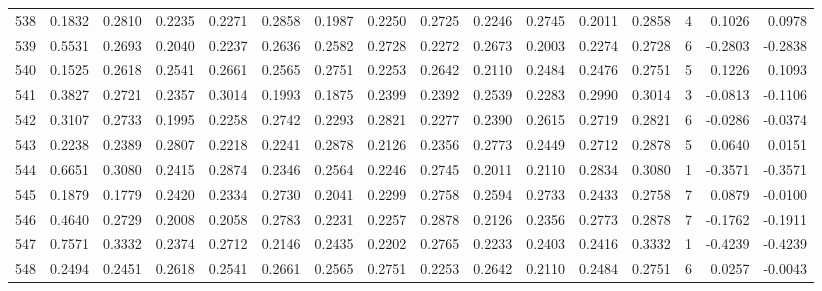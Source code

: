 \begin{tabular}{lrrrrrrrrrrrrrrr}
538 &      0.1832 &  0.2810 &  0.2235 &  0.2271 &  0.2858 &  0.1987 &  0.2250 &  0.2725 &  0.2246 &  0.2745 &   0.2011 &     0.2858 &      4 &                    0.1026 &                     0.0978 \\
539 &      0.5531 &  0.2693 &  0.2040 &  0.2237 &  0.2636 &  0.2582 &  0.2728 &  0.2272 &  0.2673 &  0.2003 &   0.2274 &     0.2728 &      6 &                   -0.2803 &                    -0.2838 \\
540 &      0.1525 &  0.2618 &  0.2541 &  0.2661 &  0.2565 &  0.2751 &  0.2253 &  0.2642 &  0.2110 &  0.2484 &   0.2476 &     0.2751 &      5 &                    0.1226 &                     0.1093 \\
541 &      0.3827 &  0.2721 &  0.2357 &  0.3014 &  0.1993 &  0.1875 &  0.2399 &  0.2392 &  0.2539 &  0.2283 &   0.2990 &     0.3014 &      3 &                   -0.0813 &                    -0.1106 \\
542 &      0.3107 &  0.2733 &  0.1995 &  0.2258 &  0.2742 &  0.2293 &  0.2821 &  0.2277 &  0.2390 &  0.2615 &   0.2719 &     0.2821 &      6 &                   -0.0286 &                    -0.0374 \\
543 &      0.2238 &  0.2389 &  0.2807 &  0.2218 &  0.2241 &  0.2878 &  0.2126 &  0.2356 &  0.2773 &  0.2449 &   0.2712 &     0.2878 &      5 &                    0.0640 &                     0.0151 \\
544 &      0.6651 &  0.3080 &  0.2415 &  0.2874 &  0.2346 &  0.2564 &  0.2246 &  0.2745 &  0.2011 &  0.2110 &   0.2834 &     0.3080 &      1 &                   -0.3571 &                    -0.3571 \\
545 &      0.1879 &  0.1779 &  0.2420 &  0.2334 &  0.2730 &  0.2041 &  0.2299 &  0.2758 &  0.2594 &  0.2733 &   0.2433 &     0.2758 &      7 &                    0.0879 &                    -0.0100 \\
546 &      0.4640 &  0.2729 &  0.2008 &  0.2058 &  0.2783 &  0.2231 &  0.2257 &  0.2878 &  0.2126 &  0.2356 &   0.2773 &     0.2878 &      7 &                   -0.1762 &                    -0.1911 \\
547 &      0.7571 &  0.3332 &  0.2374 &  0.2712 &  0.2146 &  0.2435 &  0.2202 &  0.2765 &  0.2233 &  0.2403 &   0.2416 &     0.3332 &      1 &                   -0.4239 &                    -0.4239 \\
548 &      0.2494 &  0.2451 &  0.2618 &  0.2541 &  0.2661 &  0.2565 &  0.2751 &  0.2253 &  0.2642 &  0.2110 &   0.2484 &     0.2751 &      6 &                    0.0257 &                    -0.0043 \\

\end{tabular}
